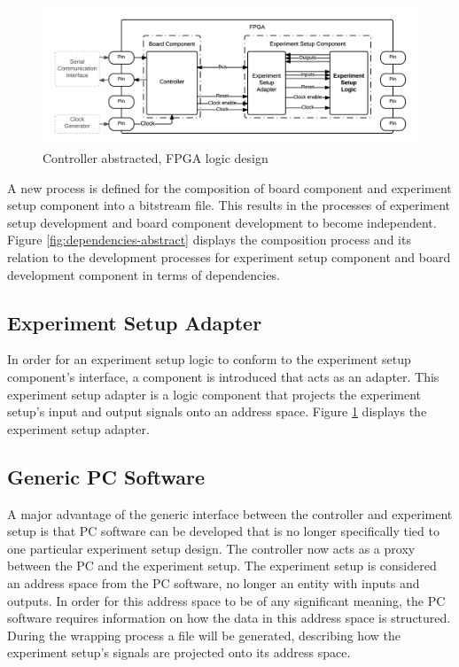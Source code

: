 \documentclass[openright]{template/uva-bachelor-thesis}
\begin{document}

\begin{figure}[h]
\centering
\includegraphics[width=.8\textwidth]{img/fpga-abstract}
\caption{Controller abstracted, FPGA logic design}
\label{fig:fpga-abstract}
\end{figure}

A new process is defined for the composition of board component and experiment setup component into a bitstream file. This results in the processes of experiment setup development and board component development to become independent. Figure \ref{fig:dependencies-abstract} displays the composition process and its relation to the  development processes for experiment setup component and board development component in terms of dependencies. 

\subsection{Experiment Setup Adapter}

In order for an experiment setup logic to conform to the experiment setup component's interface, a component is introduced that acts as an adapter. This experiment setup adapter is a logic component that projects the experiment setup's input and output signals onto an address space. Figure \ref{fig:fpga-abstract} displays the experiment setup adapter.




\subsection{Generic PC Software}
A major advantage of the generic interface between the controller and experiment setup is that PC software can be developed that is no longer specifically tied to one particular experiment setup design. The controller now acts as a proxy between the PC and the experiment setup. The experiment setup is considered an address space from the PC software, no longer an entity with inputs and outputs. In order for this address space to be of any significant meaning, the PC software requires information on how the data in this address space is structured. During the wrapping process a file will be generated, describing how the experiment setup's signals are projected onto its address space. 
\end{document}
